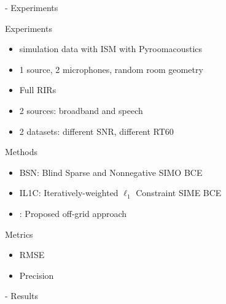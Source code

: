 \begin{frame}{\blaster - Experiments}
    \begin{block}{Experiments}
        \begin{itemize}
            \item simulation data with ISM with Pyroomacoustics
            \item 1 source, 2 microphones, random room geometry
            \item Full RIRs
            \item 2 sources: broadband and speech
            \item 2 datasets: different SNR, different RT60
        \end{itemize}
    \end{block}

    \begin{block}{Methods}
        \begin{itemize}
            \item BSN: Blind Sparse and Nonnegative SIMO BCE~\cite{Lin2007}
            \item IL1C: Iteratively-weighted $\ell_1$ Constraint SIME BCE~\cite{Crocco2015}
            \item \blaster: Proposed off-grid approach
        \end{itemize}
    \end{block}

    \begin{block}{Metrics}
        \begin{itemize}
            \item RMSE
            \item Precision
        \end{itemize}
    \end{block}

\end{frame}

\begin{frame}{\blaster - Results}

\end{frame}

\subsection{\lantern}

